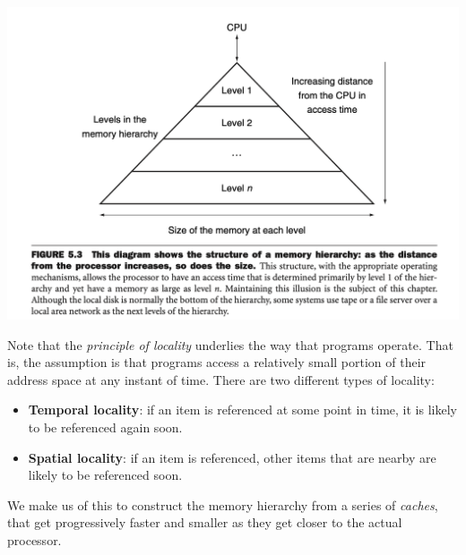 \documentclass[10pt,a4paper]{article}
\begin{document}
\begin{center}
    \includegraphics[scale=0.35]{images/memory_levels.png}
\end{center}

Note that the \textit{principle of locality} underlies the way that programs operate. That is, the assumption is that programs access a relatively small portion of their address space at any instant of time. There are two different types of locality:
\begin{itemize}
    \item \textbf{Temporal locality}: if an item is referenced at some point in time, it is likely to be referenced again soon.
    \item \textbf{Spatial locality}: if an item is referenced, other items that are nearby are likely to be referenced soon.
\end{itemize}
We make us of this to construct the memory hierarchy from a series of \textit{caches}, that get progressively faster and smaller as they get closer to the actual processor.



\end{document}
